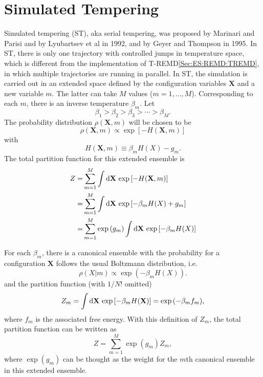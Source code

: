\section{Simulated Tempering\label{Sec:ES:ST}}
Simulated tempering (ST), aka serial tempering, was proposed by Marinari and Parisi\cite{MarinariEPL1992} and by Lyubartsev et al\cite{LyubartsevJCP1992} in 1992, and by Geyer and Thompson\cite{GeyerJASA1995} in 1995. In ST, there is only one trajectory with controlled jumps in temperature space, which is different from the implementation of T-REMD\ref{Sec:ES:REMD:TREMD}, in which multiple trajectories are running in parallel. In ST, the simulation is carried out in an extended space defined by the configuration variables $\mathbf{X}$ and a new variable $m$. The latter can take $M$ values ($m=1,\dots,M$). Corresponding to each $m$, there is an inverse temperature $\beta_m$. Let
\begin{equation}
    \beta_1>\beta_2>\beta_3>\cdots >\beta_M.
\end{equation}
The probability distribution $\rho(\mathbf{X},m)$ will be chosen to be 
\begin{equation}
  \rho(\mathbf{X},m)\propto \exp{\left[-H(\mathbf{X},m)\right]}
\end{equation}
with 
\begin{equation}
  H(\mathbf{X},m)\equiv \beta_m H(X)-g_m.
\end{equation}
The total partition function for this extended ensemble is
\begin{align}
    Z=&\sum_{m=1}^M \int\mathop{}\!\mathrm{d} \mathbf{X}\, \exp{\left[-H(\mathbf{X},m)\right]}\notag\\
     =&\sum_{m=1}^M \int\mathop{}\!\mathrm{d} \mathbf{X}\, \exp{\left[-\beta_m H(X)+g_m\right]}\notag\\
     =&\sum_{m=1}^M \exp{(g_m)}\int\mathop{}\!\mathrm{d} \mathbf{X}\, \exp{\left[-\beta_m H(X)\right]}
\end{align}

For each $\beta_m$, there is a canonical ensemble with the probability for a configuration $\mathbf{X}$ follows the usual Boltzmann distribution, i.e. 
\begin{equation}
    \rho(X|m)\propto \exp{(-\beta_m H(X))}.
\end{equation}
and the partition function (with $1/N!$ omitted)
\begin{equation}
    Z_m=\int \mathop{}\!\mathrm{d} \mathbf{X}\, \exp{[-\beta_m H(\mathbf{X})]}=\exp{(-\beta_m f_m)},
\end{equation}
where $f_m$ is the associated free energy. With this definition of $Z_m$, the total partition function can be written as
\begin{equation}
    Z=\sum_{m=1}^M \exp{(g_m)} Z_m,
\end{equation}
where $\exp{(g_m)}$ can be thought as the weight for the $m$th canonical ensemble in this extended ensemble.


